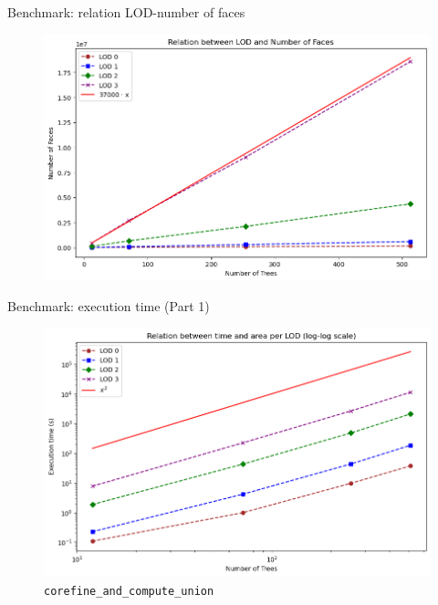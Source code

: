 \documentclass[10pt]{beamer}
\begin{document}
\begin{frame}{Benchmark: relation LOD-number of faces}
  \Large
  \begin{figure}[H]
    \centering
    \includegraphics[width=1\textwidth]{images/bench_ntree_nfaces.png}
\end{figure}
\end{frame}

\begin{frame}{Benchmark: execution time (Part 1)}
  \Large
  \begin{figure}[H]
    \centering
    \includegraphics[width=1\textwidth]{images/bench_time_ntree_quad.png}
    \caption{\texttt{corefine\_and\_compute\_union}}
  \end{figure}
\end{frame}
\end{document}
